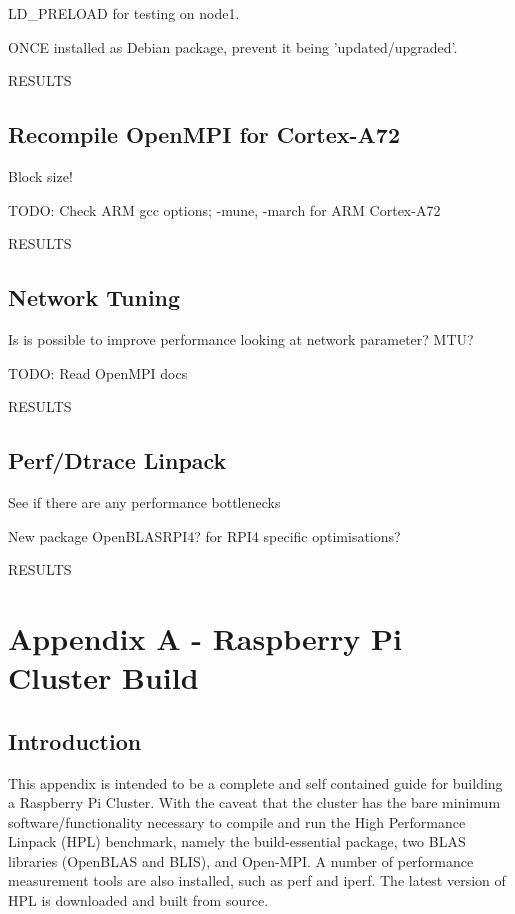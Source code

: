 \documentclass{article}
\begin{document}
LD\_PRELOAD for testing on node1.

ONCE installed as Debian package, prevent it being 'updated/upgraded'.

RESULTS

\subsection{Recompile OpenMPI for Cortex-A72}

Block size!

TODO: Check ARM gcc options; -mune, -march for ARM Cortex-A72

RESULTS

\subsection{Network Tuning}
Is is possible to improve performance looking at network parameter? MTU? 

TODO: Read OpenMPI docs

RESULTS

\subsection{Perf/Dtrace Linpack}
See if there are any performance bottlenecks

New package OpenBLASRPI4? for RPI4 specific optimisations?

RESULTS


%
%
\clearpage\section{Appendix A - Raspberry Pi Cluster Build}

\subsection{Introduction}

This appendix is intended to be a complete and self contained guide for building a Raspberry Pi Cluster. With the caveat that the cluster has the bare minimum software/functionality necessary to compile and run the High Performance Linpack (HPL) benchmark, namely the build-essential package, two BLAS libraries (OpenBLAS and BLIS), and Open-MPI. A number of performance measurement tools are also installed, such as perf and iperf. The latest version of HPL is downloaded and built from source.
\end{document}
